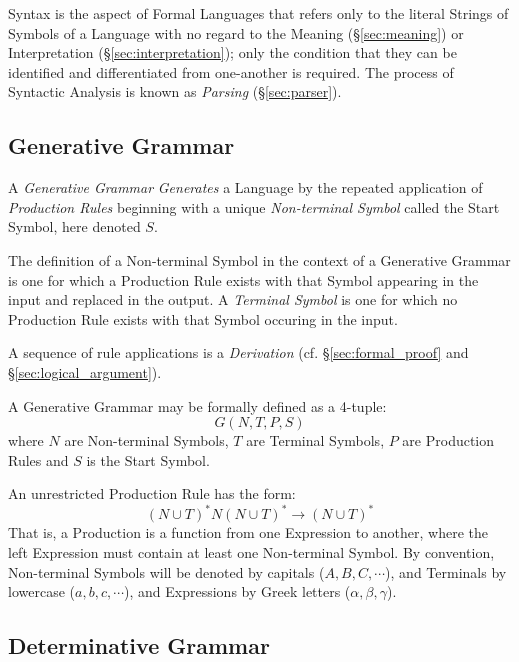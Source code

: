 Syntax is the aspect of Formal Languages that refers only to the
literal Strings of Symbols of a Language with no regard to the Meaning
(\S\ref{sec:meaning}) or Interpretation (\S\ref{sec:interpretation});
only the condition that they can be identified and differentiated from
one-another is required. The process of Syntactic Analysis is known as
\emph{Parsing} (\S\ref{sec:parser}).



\subsection{Generative Grammar}\label{sec:generative_grammar}

A \emph{Generative Grammar} \emph{Generates} a Language by the
repeated application of \emph{Production Rules} beginning with a
unique \emph{Non-terminal Symbol} called the Start Symbol, here
denoted $S$.

The definition of a Non-terminal Symbol in the context of a Generative
Grammar is one for which a Production Rule exists with that Symbol
appearing in the input and replaced in the output. A \emph{Terminal
  Symbol} is one for which no Production Rule exists with that Symbol
occuring in the input.

A sequence of rule applications is a \emph{Derivation} (cf.
\S\ref{sec:formal_proof} and \S\ref{sec:logical_argument}).

A Generative Grammar may be formally defined as a 4-tuple:
\[
  G(N,T,P,S)
\]
where $N$ are Non-terminal Symbols, $T$ are Terminal Symbols, $P$ are
Production Rules and $S$ is the Start Symbol.

An unrestricted Production Rule has the form:
\[
  (N \cup T)^*N(N \cup T)^* \rightarrow (N \cup T)^*
\]
That is, a Production is a function from one Expression to
another, where the left Expression must contain at least one
Non-terminal Symbol. By convention, Non-terminal Symbols
will be denoted by capitals ($A,B,C,\cdots$), and Terminals by
lowercase ($a,b,c,\cdots$), and Expressions by Greek letters
($\alpha,\beta,\gamma$).



\subsection{Determinative Grammar}\label{sec:determinative_grammar}

